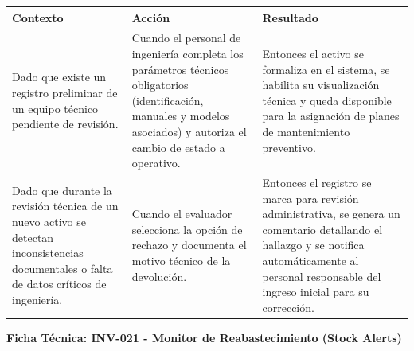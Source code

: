 \footnotesize\begin{longtable}{|p{0.28\textwidth}|p{0.32\textwidth}|p{0.34\textwidth}|}\hline
\textbf{Contexto} & \textbf{Acción} & \textbf{Resultado} \\ \hline
\parbox[t]{\linewidth}{Dado que existe un registro preliminar de un equipo técnico pendiente de revisión.} & \parbox[t]{\linewidth}{Cuando el personal de ingeniería completa los parámetros técnicos obligatorios (identificación, manuales y modelos asociados) y autoriza el cambio de estado a operativo.} & \parbox[t]{\linewidth}{Entonces el activo se formaliza en el sistema, se habilita su visualización técnica y queda disponible para la asignación de planes de mantenimiento preventivo.} \\ \hline
\parbox[t]{\linewidth}{Dado que durante la revisión técnica de un nuevo activo se detectan inconsistencias documentales o falta de datos críticos de ingeniería.} & \parbox[t]{\linewidth}{Cuando el evaluador selecciona la opción de rechazo y documenta el motivo técnico de la devolución.} & \parbox[t]{\linewidth}{Entonces el registro se marca para revisión administrativa, se genera un comentario detallando el hallazgo y se notifica automáticamente al personal responsable del ingreso inicial para su corrección.} \\ \hline
\end{longtable}\normalsize
\vspace{1em}
\noindent\textbf{Ficha Técnica: INV-021 - Monitor de Reabastecimiento (Stock Alerts)}
\footnotesize\setlength{\tabcolsep}{4pt}\renewcommand{\arraystretch}{1.2}
